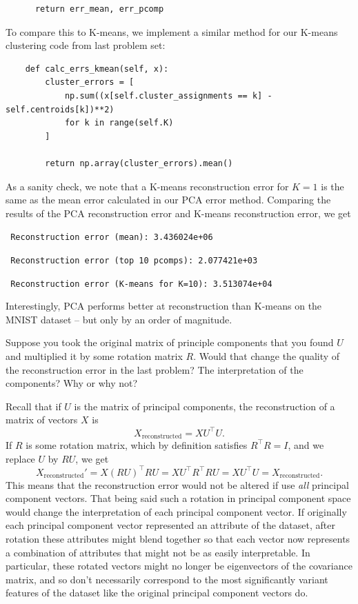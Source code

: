 \documentclass[expanded]{lkx_pset}
\begin{document}
\begin{parts}
\begin{verbatim}
      return err_mean, err_pcomp
	\end{verbatim}
	To compare this to K-means, we implement a similar method for our K-means clustering code from last problem set:
	\begin{verbatim}
    def calc_errs_kmean(self, x):
        cluster_errors = [
            np.sum((x[self.cluster_assignments == k] - self.centroids[k])**2)
            for k in range(self.K)
        ]

        return np.array(cluster_errors).mean()
	\end{verbatim}
	As a sanity check, we note that a K-means reconstruction error for $K=1$ is the same as the mean error calculated in our PCA error method. Comparing the results of the PCA reconstruction error and K-means reconstruction error, we get

	\texttt{ Reconstruction error (mean): 3.436024e+06  }

	\texttt{ Reconstruction error (top 10 pcomps): 2.077421e+03  }

	\texttt{ Reconstruction error (K-means for K=10): 3.513074e+04 }

	Interestingly, PCA performs better at reconstruction than K-means on the MNIST dataset -- but only by an order of magnitude.

	\begin{part}{4}
		Suppose you took the original matrix of principle components
		that you found $U$ and multiplied it by some rotation matrix $R$.
		Would that change the quality of the reconstruction error in the
		last problem?  The interpretation of the components?  Why or why
		not?
	\end{part}

	Recall that if $U$ is the matrix of principal components, the reconstruction of a matrix of vectors $X$ is
	\[
		X_{\textrm{reconstructed}} = XU^\intercal U.
	\]
	If $R$ is some rotation matrix, which by definition satisfies $R^\intercal R = I$, and we replace $U$ by $RU$, we get
	\[
		X_{\textrm{reconstructed}}' = X(RU)^\intercal RU = XU^\intercal R^{\intercal} RU = XU^\intercal U = X_{\textrm{reconstructed}}.
	\]
	This means that the reconstruction error would not be altered if use \emph{all} principal component vectors. That being said such a rotation in principal component space would change the interpretation of each principal component vector. If originally each principal component vector represented an attribute of the dataset, after rotation these attributes might blend together so that each vector now represents a combination of attributes that might not be as easily interpretable. In particular, these rotated vectors might no longer be eigenvectors of the covariance matrix, and so don't necessarily correspond to the most significantly variant features of the dataset like the original principal component vectors do.


\end{parts}
\end{document}
